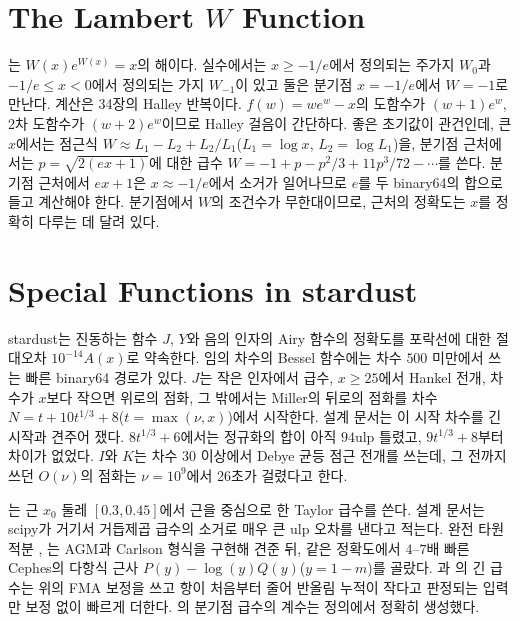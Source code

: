 \section{The Lambert $W$ Function}
\label{sec:lambertw}

는 $W(x)e^{W(x)}=x$의 해이다. 실수에서는 $x\ge-1/e$에서 정의되는 주가지 $W_0$과 $-1/e\le x<0$에서 정의되는 가지 $W_{-1}$이 있고 둘은 분기점 $x=-1/e$에서 $W=-1$로 만난다\cite{corless1996lambert}. 계산은 34장의 Halley 반복이다. $f(w)=we^w-x$의 도함수가 $(w+1)e^w$, 2차 도함수가 $(w+2)e^w$이므로 Halley 걸음이 간단하다. 좋은 초기값이 관건인데, 큰 $x$에서는 점근식 $W\approx L_1-L_2+L_2/L_1$($L_1=\log x$, $L_2=\log L_1$)을, 분기점 근처에서는 $p=\sqrt{2(ex+1)}$에 대한 급수 $W=-1+p-p^2/3+11p^3/72-\cdots$를 쓴다. 분기점 근처에서 $ex+1$은 $x\approx-1/e$에서 소거가 일어나므로 $e$를 두 binary64의 합으로 들고 계산해야 한다. 분기점에서 $W$의 조건수가 무한대이므로, 근처의 정확도는 $x$를 정확히 다루는 데 달려 있다.

\section{Special Functions in stardust}
\label{sec:special3-stardust}

\begin{instardust}
stardust는 진동하는 함수 $J$, $Y$와 음의 인자의 Airy 함수의 정확도를 포락선에 대한 절대오차 $10^{-14}A(x)$로 약속한다. 임의 차수의 Bessel 함수에는 차수 $500$ 미만에서 쓰는 빠른 binary64 경로가 있다. $J$는 작은 인자에서 급수, $x\ge25$에서 Hankel 전개, 차수가 $x$보다 작으면 위로의 점화, 그 밖에서는 Miller의 뒤로의 점화를 차수 $N=t+10t^{1/3}+8$($t=\max(\nu,x)$)에서 시작한다. 설계 문서는 이 시작 차수를 긴 시작과 견주어 쟀다. $8t^{1/3}+6$에서는 정규화의 합이 아직 $94$ulp 틀렸고, $9t^{1/3}+8$부터 차이가 없었다. $I$와 $K$는 차수 $30$ 이상에서 Debye 균등 점근 전개를 쓰는데, 그 전까지 쓰던 $O(\nu)$의 점화는 $\nu=10^9$에서 26초가 걸렸다고 한다.
\end{instardust}

\begin{instardust}
는 근 $x_0$ 둘레 $[0.3,0.45]$에서 근을 중심으로 한 Taylor 급수를 쓴다. 설계 문서는 scipy가 거기서 거듭제곱 급수의 소거로 매우 큰 ulp 오차를 낸다고 적는다. 완전 타원적분 , 는 AGM과 Carlson 형식을 구현해 견준 뒤, 같은 정확도에서 $4$--$7$배 빠른 Cephes의 다항식 근사 $P(y)-\log(y)Q(y)$($y=1-m$)를 골랐다. 과 의 긴 급수는 위의 FMA 보정을 쓰고 항이 처음부터 줄어 반올림 누적이 작다고 판정되는 입력만 보정 없이 빠르게 더한다. 의 분기점 급수의 계수는 정의에서 정확히 생성했다.
\end{instardust}

